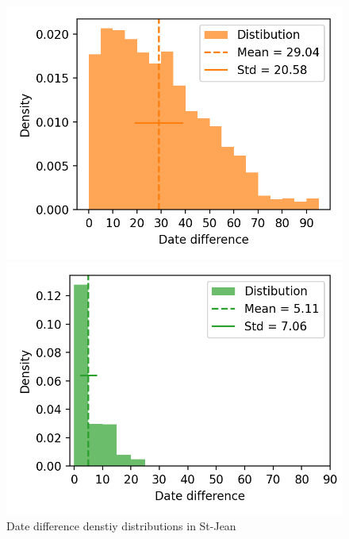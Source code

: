 \begin{figure}
  \centering
  \caption{Date difference denstiy distributions in St-Jean}

  \label{fig:dates_differences_false}
  \includegraphics[width=\linewidth]{img/dates_differences_false.png}

  \label{fig:dates_differences_r_true}
  \includegraphics[width=\linewidth]{img/dates_differences_r_true.png}


\end{figure}
